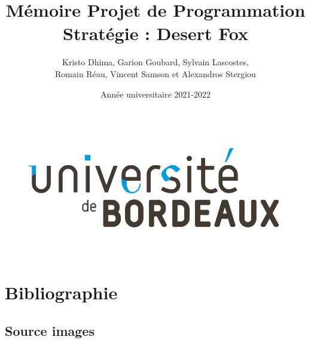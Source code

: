 \documentclass{article}[a4paper, 12pt]
\title{\LARGE \textbf{Mémoire Projet de Programmation  } \\ \Large \textbf{Stratégie : Desert Fox}}
\author{Kristo Dhima, Garion Goubard, Sylvain Lascostes, \\Romain Réau, Vincent Samson et Alexandros Stergiou }
\date{Année universitaire 2021-2022}
\begin{document}
\maketitle
\begin{center}
    \center
    \includegraphics[scale=0.2]{data/Universite_Bordeaux_RVB-10.jpg}

\end{center}

\newpage

{\hypersetup{hidelinks} \tableofcontents} %


\newpage



\newpage


\newpage


\newpage


\newpage








\section{Bibliographie}




\subsection{Source images}

\printendnotes


\end{document}
